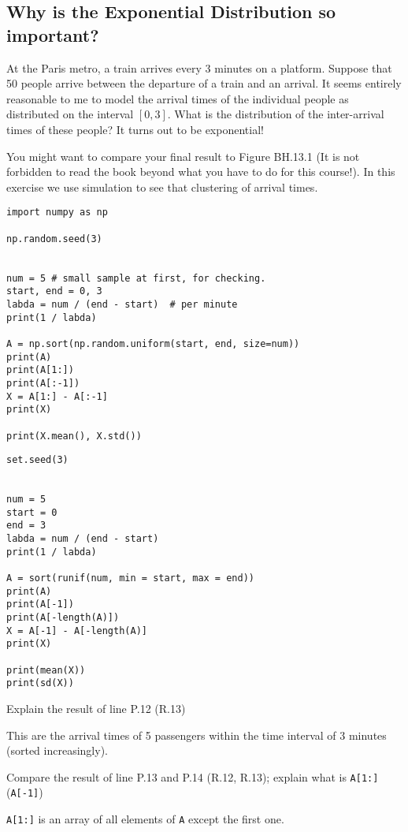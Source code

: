 

\subsection{Why is the Exponential Distribution so important?}

At the Paris metro, a train arrives every 3 minutes on a platform.
Suppose that 50 people arrive between the departure of a train and an arrival.
It seems entirely reasonable to me to model the arrival times of the individual people as distributed on the interval \([0,3]\).
What is the distribution of the inter-arrival times of these people?
It turns out to be exponential!

You might want to compare your final result to Figure BH.13.1 (It is not forbidden to read the book beyond what you have to do for this course!).
In this exercise we use simulation to see that clustering of arrival times.


\begin{verbatim}
import numpy as np

np.random.seed(3)


num = 5 # small sample at first, for checking.
start, end = 0, 3
labda = num / (end - start)  # per minute
print(1 / labda)

A = np.sort(np.random.uniform(start, end, size=num))
print(A)
print(A[1:])
print(A[:-1])
X = A[1:] - A[:-1]
print(X)

print(X.mean(), X.std())
\end{verbatim}


\begin{verbatim}
set.seed(3)


num = 5
start = 0
end = 3
labda = num / (end - start)
print(1 / labda)

A = sort(runif(num, min = start, max = end))
print(A)
print(A[-1])
print(A[-length(A)])
X = A[-1] - A[-length(A)]
print(X)

print(mean(X))
print(sd(X))
\end{verbatim}

\begin{exercise}
Explain the result of line P.12 (R.13)
\begin{solution}
This are the arrival times of 5 passengers within the time interval of 3 minutes (sorted increasingly).
\end{solution}
\end{exercise}

\begin{exercise}
Compare the result of  line P.13 and P.14 (R.12, R.13);  explain what is \texttt{A[1:]} (\texttt{A[-1]})
\begin{solution}
\verb|A[1:]| is an array of all elements of \verb|A| except the first one.
\end{solution}
\end{exercise}

